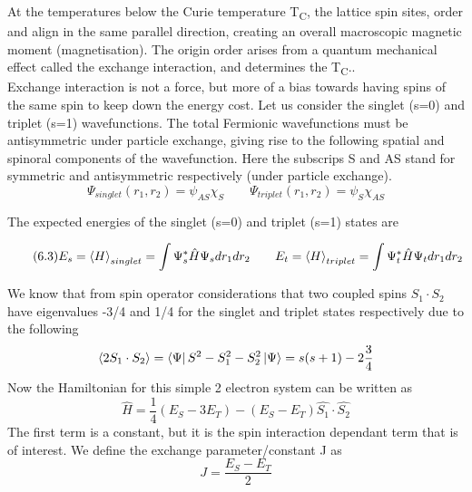\documentclass[12pt]{article}
\begin{document}
At the temperatures below the Curie temperature T\textsubscript{C}, the lattice spin sites, order and align in the same parallel direction, creating an overall macroscopic magnetic moment (magnetisation). The origin order arises from a quantum mechanical effect called the exchange interaction, and determines the T\textsubscript{C}.. 
\\
Exchange interaction is not a force, but more of a bias towards having spins of the same spin to keep down the energy cost. Let us consider the singlet (s=0) and triplet (s=1) wavefunctions. The total Fermionic wavefunctions must be antisymmetric under particle exchange, giving rise to the following spatial and spinoral components of the wavefunction. Here the subscrips S and AS stand for symmetric and antisymmetric respectively (under particle exchange).
\begin{equation} \label{4.1} \tag{6.2}
\Psi_{singlet}(r_1,r_2)=\psi_{AS}\chi_S \qquad \Psi_{triplet}(r_1,r_2)=\psi_{S}\chi_{AS}
\end{equation}

The expected energies of the singlet (s=0) and triplet (s=1) states are

\begin{equation} \label{4.1} \tag{6.3}
E_s=\expval{H}_{singlet}=\int \Psi_s^*\hat{H}\Psi_sdr_1dr_2 \qquad E_t=\expval{H}_{triplet}=\int \Psi_t^*\hat{H}\Psi_tdr_1dr_2
\end{equation}



We know that from spin operator considerations that two coupled spins $S_1\cdot S_2$ have eigenvalues -3/4 and 1/4 for the singlet and triplet states respectively\cite{blundell} due to the following
$$\expval{2S_1\cdot S_2}=\bra{\Psi}S^2-S_1^2-S_2^2\ket{\Psi}=s(s+1)-2\frac{3}{4}$$
Now the Hamiltonian for this simple 2 electron system can be written as
\begin{equation} \label{4.1} \tag{6.4}
\hat{H}=\frac{1}{4}(E_S-3E_T)-(E_S-E_T)\hat{S_1} \cdot \hat{S_2}
\end{equation}
The first term is a constant, but it is the spin interaction dependant term that is of interest.
We define the exchange parameter/constant J \cite{blundell}as
\begin{equation} \label{4.1} \tag{6.5}
J=\frac{E_S-E_T}{2}
\end{equation}
\end{document}
